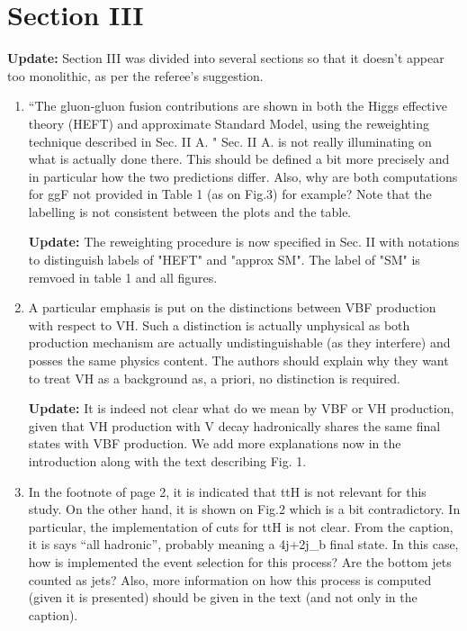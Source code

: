 \documentclass[12pt]{article}
\begin{document}
\section*{Section III}
{\bf Update:}  Section III was divided into several sections so that it doesn't appear too monolithic, as per the referee's suggestion. 
\begin{enumerate}
\item ``The gluon-gluon fusion contributions are shown in both the Higgs effective theory (HEFT) and approximate Standard Model, using the reweighting technique described in Sec. II A. " Sec. II A. is not really illuminating on what is actually done there. This should be defined a bit more precisely and in particular how the two predictions differ. Also, why are both computations for ggF not provided in Table 1 (as on Fig.3) for example? Note that the labelling is not consistent between the plots and the table.

{\bf Update:} The reweighting procedure is now specified in Sec. II with notations to distinguish labels of "HEFT" and "approx SM". The label of "SM" is remvoed in table 1 and all figures. 

\item A particular emphasis is put on the distinctions between VBF production with respect to VH. Such a distinction is actually unphysical as both production mechanism are actually undistinguishable (as they interfere) and posses the same physics content. The authors should explain why they want to treat VH as a background as, a priori, no distinction is required.

{\bf Update:} It is indeed not clear what do we mean by VBF or VH production, given that VH production with V decay hadronically shares the same final states with VBF production. We add more explanations now in the introduction along with the text describing Fig. 1.

\item In the footnote of page 2, it is indicated that ttH is not relevant for this study. On the other hand, it is shown on Fig.2 which is a bit contradictory. In particular, the implementation of cuts for ttH is not clear. From the caption, it is says “all hadronic”, probably meaning a 4j+2j\_b final state. In this case, how is implemented the event selection for this process? Are the bottom jets counted as jets? Also, more information on how this process is computed (given it is presented) should be given in the text (and not only in the caption).


\end{enumerate}
\end{document}

